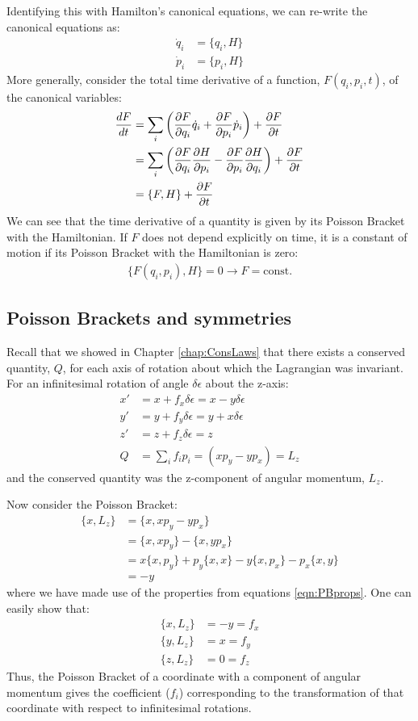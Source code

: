 Identifying this with Hamilton's canonical equations, we can re-write the canonical equations as:
\begin{align}
\dot q_i&=\{q_i,H\}\nonumber\\
\dot p_i&=\{p_i,H\}\nonumber
\end{align}
More generally, consider the total time derivative of a function, $F(q_i,p_i,t)$, of the canonical variables:
\begin{align}
\frac{dF}{dt}&=\sum_i\left(\frac{\partial F}{\partial q_i}\dot q_i+\frac{\partial F}{\partial p_i}\dot p_i\right)+\frac{\partial F}{\partial t}\nonumber\\
&=\sum_i\left(\frac{\partial F}{\partial q_i}\frac{\partial H}{\partial p_i}-\frac{\partial F}{\partial p_i}\frac{\partial H}{\partial q_i}\right)+\frac{\partial F}{\partial t}\nonumber\\
&=\{F,H\}+\frac{\partial F}{\partial t}
\end{align}
We can see that the time derivative of a quantity is given by its Poisson Bracket with the Hamiltonian. If $F$ does not depend explicitly on time, it is a constant of motion if its Poisson Bracket with the Hamiltonian is zero:
\begin{align}
\{F(q_i,p_i),H\}=0 \to F=\text{const.}
\end{align}


\subsection{Poisson Brackets and symmetries}
Recall that we showed in Chapter \ref{chap:ConsLaws} that there exists a conserved quantity, $Q$, for each axis of rotation about which the Lagrangian was invariant.  For an infinitesimal rotation of angle $\delta \epsilon$ about the z-axis:
\begin{align}
x' &= x+f_x\delta\epsilon = x-y\delta \epsilon\nonumber\\
y' &= y+f_y\delta\epsilon = y+x\delta \epsilon\nonumber\\
z' &= z+f_z\delta\epsilon = z \nonumber\\
Q&=\sum_i f_ip_i=(xp_y - yp_x)=L_z\nonumber
\end{align}
and the conserved quantity was the z-component of angular momentum, $L_z$.

Now consider the Poisson Bracket:
\begin{align}
\{x,L_z\}&=\{x,xp_y - yp_x\}\nonumber\\
&=\{x,xp_y\} - \{x,yp_x\}\nonumber\\
&=x\{x,p_y\}+p_y\{x,x\} - y\{x,p_x\}-p_x\{x,y\}\nonumber\\
&=-y
\end{align}
where we have made use of the properties from equations \ref{eqn:PBprops}. One can easily show that:
\begin{align}
\{x,L_z\}&=-y=f_x\nonumber\\
\{y,L_z\}&=x=f_y\nonumber\\
\{z,L_z\}&=0=f_z
\end{align}
Thus, the Poisson Bracket of a coordinate with a component of angular momentum gives the coefficient ($f_i$) corresponding to the transformation of that coordinate with respect to infinitesimal rotations.

